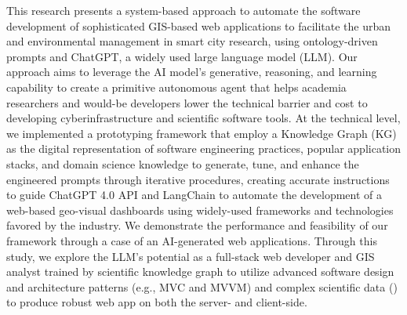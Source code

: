 This research presents a system-based approach to automate the software development of sophisticated GIS-based web applications to facilitate the urban and environmental management in smart city research, using ontology-driven prompts and ChatGPT, a widely used large language model (LLM). Our approach aims to leverage the AI model's generative, reasoning, and learning capability to create a primitive autonomous agent that helps academia researchers and would-be developers lower the technical barrier and cost to developing cyberinfrastructure and scientific software tools. At the technical level, we implemented a prototyping framework that employ a Knowledge Graph (KG) as the digital representation of software engineering practices, popular application stacks, and domain science knowledge to generate, tune, and enhance the engineered prompts through iterative procedures, creating accurate instructions to guide ChatGPT 4.0 API and LangChain to automate the development of a web-based geo-visual dashboards using widely-used frameworks and technologies favored by the industry. We demonstrate the performance and feasibility of our framework through a case of an AI-generated web applications. Through this study, we explore the LLM's potential as a full-stack web developer and GIS analyst trained by scientific knowledge graph to utilize advanced software design and architecture patterns (e.g., MVC and MVVM) and complex scientific data () to produce robust web app on both the server- and client-side. 